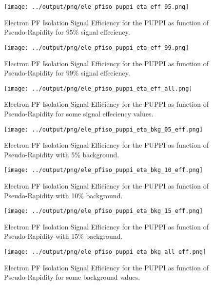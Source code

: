\documentclass[11pt]{book}
\begin{document}
\begin{figure}[htb]
\centering
\texttt{[image: ../output/png/ele\_pfiso\_puppi\_eta\_eff\_95.png]}
\caption{Electron PF Isolation Signal Efficiency for the PUPPI as function of Pseudo-Rapidity for 95\% signal effeciency.}
\label{fig:ele_pfiso_eta_eff_puppi_eff_95}
\end{figure}

\begin{figure}[htb]
\centering
\texttt{[image: ../output/png/ele\_pfiso\_puppi\_eta\_eff\_99.png]}
\caption{Electron PF Isolation Signal Efficiency for the PUPPI as function of Pseudo-Rapidity for 99\% signal effeciency.}
\label{fig:ele_pfiso_eta_eff_puppi_eff_99}
\end{figure}

\begin{figure}[htb]
\centering
\texttt{[image: ../output/png/ele\_pfiso\_puppi\_eta\_eff\_all.png]}
\caption{Electron PF Isolation Signal Efficiency for the PUPPI as function of Pseudo-Rapidity for some signal effeciency values.}
\label{fig:ele_pfiso_eta_eff_puppi_eff_all}
\end{figure}

\begin{figure}[htb]
\centering
\texttt{[image: ../output/png/ele\_pfiso\_puppi\_eta\_bkg\_05\_eff.png]}
\caption{Electron PF Isolation Signal Efficiency for the PUPPI as function of Pseudo-Rapidity with 5\% background.}
\label{fig:ele_pfiso_eta_bkg_puppi_bkg_05_eff}
\end{figure}

\begin{figure}[htb]
\centering
\texttt{[image: ../output/png/ele\_pfiso\_puppi\_eta\_bkg\_10\_eff.png]}
\caption{Electron PF Isolation Signal Efficiency for the PUPPI as function of Pseudo-Rapidity with 10\% background.}
\label{fig:ele_pfiso_eta_bkg_puppi_bkg_10_eff}
\end{figure}

\begin{figure}[htb]
\centering
\texttt{[image: ../output/png/ele\_pfiso\_puppi\_eta\_bkg\_15\_eff.png]}
\caption{Electron PF Isolation Signal Efficiency for the PUPPI as function of Pseudo-Rapidity with 15\% background.}
\label{fig:ele_pfiso_eta_bkg_puppi_bkg_15_eff}
\end{figure}

\begin{figure}[htb]
\centering
\texttt{[image: ../output/png/ele\_pfiso\_puppi\_eta\_bkg\_all\_eff.png]}
\caption{Electron PF Isolation Signal Efficiency for the PUPPI as function of Pseudo-Rapidity for some background values.}
\label{fig:ele_pfiso_eta_bkg_puppi_bkg_all_eff}
\end{figure}
\clearpage
\end{document}
